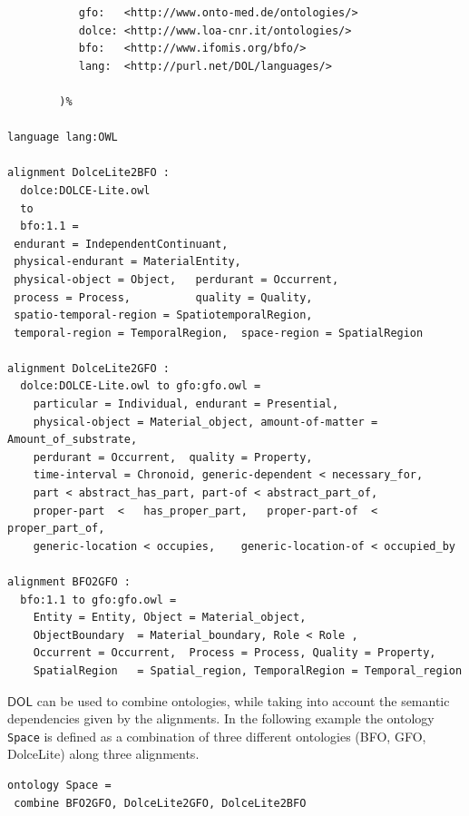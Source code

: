\documentclass[10pt, a4paper]{isov2}
\newcommand*{\DOL}{\ensuremath{\mathsf{DOL}}\xspace}
\begin{document}
\begin{lstlisting}[basicstyle=\ttfamily\footnotesize,language=dolText,escapechar=@,mathescape]
%prefix(
           gfo:   <http://www.onto-med.de/ontologies/>
           dolce: <http://www.loa-cnr.it/ontologies/>
           bfo:   <http://www.ifomis.org/bfo/>
           lang:  <http://purl.net/DOL/languages/>

        )%

language lang:OWL

alignment DolceLite2BFO :
  dolce:DOLCE-Lite.owl
  to
  bfo:1.1 =
 endurant = IndependentContinuant,
 physical-endurant = MaterialEntity,
 physical-object = Object,   perdurant = Occurrent,
 process = Process,          quality = Quality,
 spatio-temporal-region = SpatiotemporalRegion,
 temporal-region = TemporalRegion,  space-region = SpatialRegion

alignment DolceLite2GFO :
  dolce:DOLCE-Lite.owl to gfo:gfo.owl =
 	particular = Individual, endurant = Presential,
 	physical-object = Material_object, amount-of-matter = Amount_of_substrate,
 	perdurant = Occurrent, 	quality = Property,
 	time-interval = Chronoid, generic-dependent < necessary_for,
 	part < abstract_has_part, part-of < abstract_part_of,
 	proper-part  <	 has_proper_part,  	proper-part-of  < proper_part_of,
 	generic-location < occupies, 	generic-location-of < occupied_by

alignment BFO2GFO :
  bfo:1.1 to gfo:gfo.owl =
	Entity = Entity, Object = Material_object,
	ObjectBoundary  = Material_boundary, Role < Role ,
 	Occurrent = Occurrent, 	Process = Process, Quality = Property,
 	SpatialRegion 	= Spatial_region, TemporalRegion = Temporal_region 	
\end{lstlisting}


 \DOL can be used to combine ontologies, while taking into account the semantic dependencies given by the alignments. In the following example the ontology \lstinline{Space} is defined as a combination of three different ontologies (BFO, GFO, DolceLite) along three alignments. 

\begin{lstlisting}[basicstyle=\ttfamily\footnotesize,language=dolText,escapechar=@,mathescape]
ontology Space =
 combine BFO2GFO, DolceLite2GFO, DolceLite2BFO
\end{lstlisting} 



\end{document}
